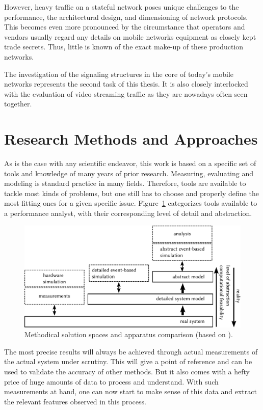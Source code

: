 However, heavy traffic on a stateful network poses unique challenges to the performance, the architectural design, and dimensioning of network protocols. This becomes even more pronounced by the circumstance that operators and vendors usually regard any details on mobile networks equipment as closely kept trade secrets. Thus, little is known of the exact make-up of these production networks.

The investigation of the signaling structures in the core of today's mobile networks represents the second task of this thesis. It is also closely interlocked with the evaluation of video streaming traffic as they are nowadays often seen together.


\section{Research Methods and Approaches}

As is the case with any scientific endeavor, this work is based on a specific set of tools and knowledge of many years of prior research. Measuring, evaluating and modeling is standard practice in many fields. Therefore, tools are available to tackle most kinds of problems, but one still has to choose and properly define the most fitting ones for a given specific issue. Figure~\ref{c1:fig:appcomp} categorizes tools available to a performance analyst, with their corresponding level of detail and abstraction. 

\begin{figure}[htb]
	\centering
	\includegraphics[width=1.0\textwidth]{images/apparatus.pdf}
	\caption{Methodical solution spaces and apparatus comparison (based on \cite[p.~2]{tran2005einfuhrung}).}
\label{c1:fig:appcomp}
\end{figure}

The most precise results will always be achieved through actual measurements of the actual system under scrutiny. This will give a point of reference and can be used to validate the accuracy of other methods. But it also comes with a hefty price of huge amounts of data to process and understand. With such measurements at hand, one can now start to make sense of this data and extract the relevant features observed in this process.

